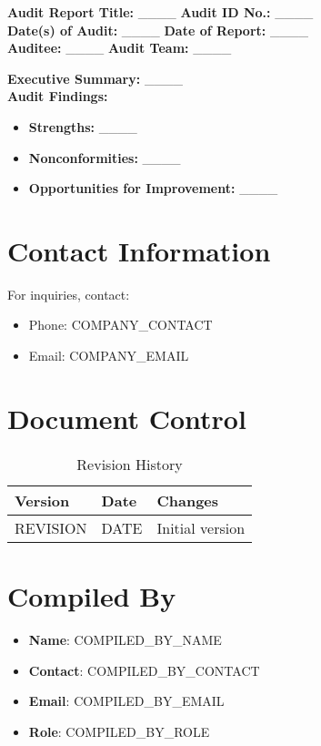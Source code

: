 \documentclass[12pt]{article}
\begin{document}
\textbf{Audit Report Title:} \_\_\_\_ \textbf{Audit ID No.:} \_\_\_\_\\
\textbf{Date(s) of Audit:} \_\_\_\_ \textbf{Date of Report:} \_\_\_\_\\
\textbf{Auditee:} \_\_\_\_ \textbf{Audit Team:} \_\_\_\_

\textbf{Executive Summary:} \_\_\_\_\\
\textbf{Audit Findings:}
\begin{itemize}
    \item \textbf{Strengths:} \_\_\_\_
    \item \textbf{Nonconformities:} \_\_\_\_
    \item \textbf{Opportunities for Improvement:} \_\_\_\_
\end{itemize}

\section{Contact Information}
For inquiries, contact:
\begin{itemize}
    \item Phone: {{COMPANY_CONTACT}}
    \item Email: {{COMPANY_EMAIL}}
\end{itemize}

\section{Document Control}
\begin{table}[h]
    \centering
    \begin{tabular}{p{3cm}p{3cm}p{6cm}}
        \toprule
        \textbf{Version} & \textbf{Date} & \textbf{Changes} \\
        \midrule
        {{REVISION}} & {{DATE}} & Initial version \\
        \bottomrule
    \end{tabular}
    \caption{Revision History}
\end{table}

\section{Compiled By}
\begin{itemize}
    \item \textbf{Name}: {{COMPILED_BY_NAME}}
    \item \textbf{Contact}: {{COMPILED_BY_CONTACT}}
    \item \textbf{Email}: {{COMPILED_BY_EMAIL}}
    \item \textbf{Role}: {{COMPILED_BY_ROLE}}
\end{itemize}
\end{document}
